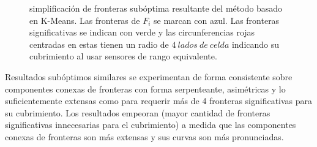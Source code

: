 \begin{figure}[H]
  \centering
  \qquad

  \caption[Simplificación de fronteras subóptima resultante del método basado en K-Means.]{simplificación de fronteras subóptima resultante del método basado en K-Means. Las fronteras de $F_i$ se marcan con azul. Las fronteras significativas se indican con verde y las
    circunferencias rojas centradas en estas tienen un radio de $4\ lados\ de\ celda$ indicando su cubrimiento
    al usar sensores de rango equivalente.}\label{fig:ejemploFSKMMal}
\end{figure}
Resultados subóptimos similares se experimentan de forma consistente sobre
componentes conexas de fronteras con forma serpenteante, asimétricas y lo suficientemente
extensas como para requerir más de 4 fronteras significativas para su
cubrimiento. 
Los resultados empeoran (mayor cantidad de fronteras significativas
innecesarias para el cubrimiento) a medida que las componentes conexas de
fronteras son más extensas y sus curvas son más pronunciadas.

